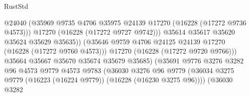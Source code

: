 \begin{lexlean}{RustStd}
\begin{coremodule}
                                              @24040
                                              (@35969
                                                @9735
                                                @4706
                                                @35975
                                                @24139
                                                @17270
                                                (@16228 (@17272 @9736 @4573)))
                                              @17270
                                              (@16228 (@17272 @9727 @9742)))
                                            @35614
                                            @35617
                                            @35620
                                            @35624
                                            @35629
                                            @35635))
                                        (@35646
                                          @9759
                                          @4706
                                          @24125
                                          @24139
                                          @17270
                                          (@16228 (@17272 @9760 @4573)))
                                        @17270
                                        (@16228 (@17272 @9720 @9766)))
                                      @35664
                                      @35667
                                      @35670
                                      @35674
                                      @35679
                                      @35685)
                                    (@35691
                                      @9776
                                      @3276
                                      @3282
                                      @96
                                      @4573
                                      @9779
                                      @4573
                                      @9783
                                      (@36030
                                        @3276
                                        @96
                                        @9779
                                        (@36034
                                          @3275
                                          @9779
                                          (@16223 (@16224 @9779))
                                          (@16228 (@16230 @3275 @96))))
                                      (@36030
                                        @3282

\end{coremodule}
\end{lexlean}
